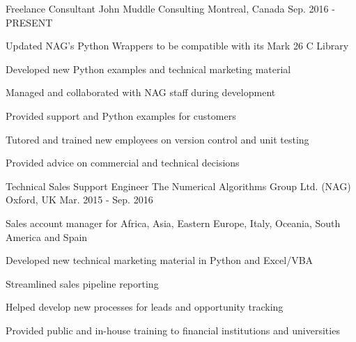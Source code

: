 

\begin{cventries}

  \cventry
    {Freelance Consultant} %
    {John Muddle Consulting} %
    {Montreal, Canada} %
    {Sep. 2016 - PRESENT} %
    {
      \begin{cvitems} %
        \item {Updated NAG's Python Wrappers to be compatible with its Mark 26 C Library}
        \item {Developed new Python examples and technical marketing material}
        \item {Managed and collaborated with NAG staf\/f during development}
        \item {Provided support and Python examples for customers}
       \item{Tutored and trained new employees on version control and unit testing}
       \item{Provided advice on commercial and technical decisions}
      \end{cvitems}
    }

  \cventry
    {Technical Sales Support Engineer} %
    {The Numerical Algorithms Group Ltd. (NAG)} %
    {Oxford, UK} %
    {Mar. 2015 - Sep. 2016} %
    {
      \begin{cvitems} %
        \item {Sales account manager for Africa, Asia, Eastern Europe, Italy, Oceania, South America and Spain}
        \item {Developed new technical marketing material in Python and Excel/VBA}
        \item {Streamlined sales pipeline reporting}
        \item {Helped develop new processes for leads and opportunity tracking}
        \item {Provided public and in-house training to financial institutions and universities}
      \end{cvitems}
    }
    
\end{cventries}
